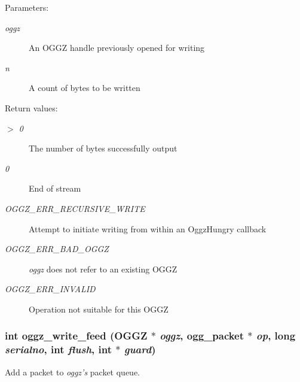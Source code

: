 \begin{Desc}
\item[Parameters:]
\begin{description}
\item[{\em oggz}]An OGGZ handle previously opened for writing \item[{\em n}]A count of bytes to be written \end{description}
\end{Desc}
\begin{Desc}
\item[Return values:]
\begin{description}
\item[{\em $>$ 0}]The number of bytes successfully output \item[{\em 0}]End of stream \item[{\em OGGZ\_\-ERR\_\-RECURSIVE\_\-WRITE}]Attempt to initiate writing from within an Oggz\-Hungry callback \item[{\em OGGZ\_\-ERR\_\-BAD\_\-OGGZ}]{\em oggz\/} does not refer to an existing OGGZ \item[{\em OGGZ\_\-ERR\_\-INVALID}]Operation not suitable for this OGGZ \end{description}
\end{Desc}
\subsubsection{\setlength{\rightskip}{0pt plus 5cm}int oggz\_\-write\_\-feed ({\bf OGGZ} $\ast$ {\em oggz}, ogg\_\-packet $\ast$ {\em op}, long {\em serialno}, int {\em flush}, int $\ast$ {\em guard})}\label{group__write__api_a2}


Add a packet to {\em oggz's\/} packet queue. 

